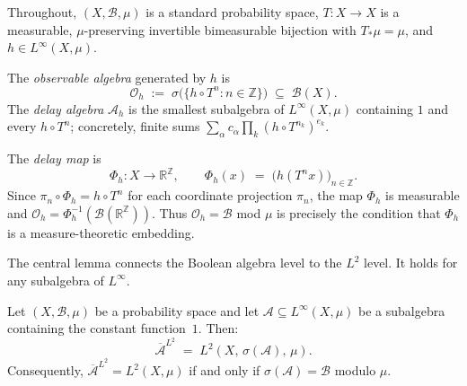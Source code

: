 Throughout, $(X, \mathcal{B}, \mu)$ is a standard
probability space, $T : X \to X$ is a measurable, $\mu$-preserving invertible
bimeasurable bijection with $T_*\mu = \mu$, and $h \in L^\infty(X, \mu)$.

\begin{definition}
\label{II:def:obs-algebra}
The \emph{observable algebra} generated by $h$ is
\[
  \mathcal{O}_h \;:=\; \sigma\!\bigl(\{h \circ T^n : n \in \mathbb{Z}\}\bigr)
  \;\subseteq\; \mathcal{B}(X).
\]
The \emph{delay algebra} $\mathcal{A}_h$ is the smallest subalgebra of
$L^\infty(X, \mu)$ containing $1$ and every $h \circ T^n$; concretely, finite
sums $\sum_\alpha c_\alpha \prod_k (h \circ T^{n_k})^{e_k}$.
\end{definition}

\begin{definition}
\label{II:def:delay-map}
The \emph{delay map} is
\[
  \Phi_h : X \to \mathbb{R}^\mathbb{Z},
  \qquad
  \Phi_h(x) \;=\; \bigl(h(T^n x)\bigr)_{n \in \mathbb{Z}}.
\]
Since $\pi_n \circ \Phi_h = h \circ T^n$ for each coordinate projection $\pi_n$,
the map $\Phi_h$ is measurable and
$\mathcal{O}_h = \Phi_h^{-1}(\mathcal{B}(\mathbb{R}^\mathbb{Z}))$.
Thus $\mathcal{O}_h = \mathcal{B}$ mod $\mu$ is precisely the condition that
$\Phi_h$ is a measure-theoretic embedding.
\end{definition}

The central lemma connects the Boolean algebra level to the $L^2$ level.
It holds for any subalgebra of $L^\infty$.

\begin{lemma}
\label{II:lem:density-bridge}
Let $(X, \mathcal{B}, \mu)$ be a probability space and let
$\mathcal{A} \subseteq L^\infty(X, \mu)$ be a subalgebra containing the
constant function~$1$.  Then:
\[
  \overline{\mathcal{A}}^{L^2}
  \;=\;
  L^2(X,\, \sigma(\mathcal{A}),\, \mu).
\]
Consequently, $\overline{\mathcal{A}}^{L^2} = L^2(X, \mu)$ if and only if
$\sigma(\mathcal{A}) = \mathcal{B}$ modulo $\mu$.
\end{lemma}

